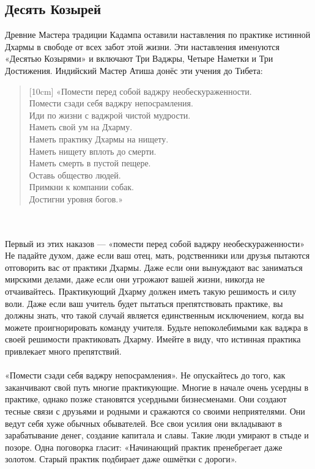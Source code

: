 \subsection{Десять Козырей}
Древние Мастера традиции Кадампа оставили наставления по практике истинной Дхармы в свободе от всех забот этой жизни. Эти наставления именуются «Десятью Козырями» и включают Три Ваджры, Четыре Наметки и Три Достижения. Индийский Мастер Атиша донёс эти учения до Тибета:
\begin{verse}[10cm]
«Помести перед собой ваджру необескураженности.\\
Помести сзади себя ваджру непосрамления.\\
Иди по жизни с ваджрой чистой мудрости.\\
Наметь свой ум на Дхарму.\\
Наметь практику Дхармы на нищету.\\
Наметь нищету вплоть до смерти.\\
Наметь смерть в пустой пещере.\\
Оставь общество людей.\\
Примкни к компании собак.\\
Достигни уровня богов.»
\end{verse}
\\ \\ Первый из этих наказов — «помести перед собой ваджру необескураженности» Не падайте духом, даже если ваш отец, мать, родственники или друзья пытаются отговорить вас от практики Дхармы. Даже если они вынуждают вас заниматься мирскими делами, даже если они угрожают вашей жизни, никогда не отчаивайтесь. Практикующий Дхарму должен иметь такую решимость и силу воли. Даже если ваш учитель будет пытаться препятствовать практике, вы должны знать, что такой случай является единственным исключением, когда вы можете проигнорировать команду учителя. Будьте непоколебимыми как ваджра в своей решимости практиковать Дхарму. Имейте в виду, что истинная практика привлекает много препятствий.
\\ \\ «Помести сзади себя ваджру непосрамления». Не опускайтесь до того, как заканчивают свой путь многие практикующие. Многие в начале очень усердны в практике, однако позже становятся усердными бизнесменами. Они создают тесные связи с друзьями и родными и сражаются со своими неприятелями. Они ведут себя хуже обычных обывателей. Все свои усилия они вкладывают в зарабатывание денег, создание капитала и славы. Такие люди умирают в стыде и позоре. Одна поговорка гласит: «Начинающий практик пренебрегает даже золотом. Старый практик подбирает даже ошмётки с дороги».
